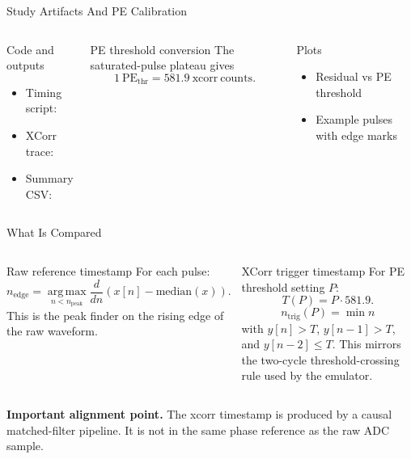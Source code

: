 \documentclass[aspectratio=169]{beamer}
\newcommand{\xcperpe}{\num{581.9}}
\begin{document}
\begin{frame}{Study Artifacts And PE Calibration}
\footnotesize
\begin{columns}[T,onlytextwidth]
\begin{block}{Code and outputs}
\begin{itemize}
  \item Timing script: 
  \item XCorr trace: 
  \item Summary CSV: 
\end{itemize}
\end{block}

\begin{block}{PE threshold conversion}
The saturated-pulse plateau gives
\[
1~\mathrm{PE}_{\mathrm{thr}} = \xcperpe~\mathrm{xcorr~counts}.
\]
\end{block}

\begin{block}{Plots}
\begin{itemize}
  \item Residual vs PE threshold
  \item Example pulses with edge marks
\end{itemize}
\end{block}
\end{columns}
\end{frame}

\begin{frame}{What Is Compared}
\scriptsize
\begin{columns}[T,onlytextwidth]
\begin{block}{Raw reference timestamp}
For each pulse:
\[
n_{\mathrm{edge}} = 
\operatorname*{arg\,max}_{n<n_{\mathrm{peak}}}
  \frac{d}{dn}\left(x[n]-\mathrm{median}(x)\right).
\]
This is the peak finder on the rising edge of the raw waveform.
\end{block}

\begin{block}{XCorr trigger timestamp}
For PE threshold setting \(P\):
\[
T(P)=P\cdot \xcperpe .
\]
\[
n_{\mathrm{trig}}(P)=\min n
\]
with \(y[n]>T\), \(y[n-1]>T\), and \(y[n-2]\le T\). This mirrors the two-cycle threshold-crossing rule used by the emulator.
\end{block}
\end{columns}

\vspace{0.15em}
\textbf{Important alignment point.}
The xcorr timestamp is produced by a causal matched-filter pipeline. It is not in the same phase reference as the raw ADC sample.
\end{frame}
\end{document}
